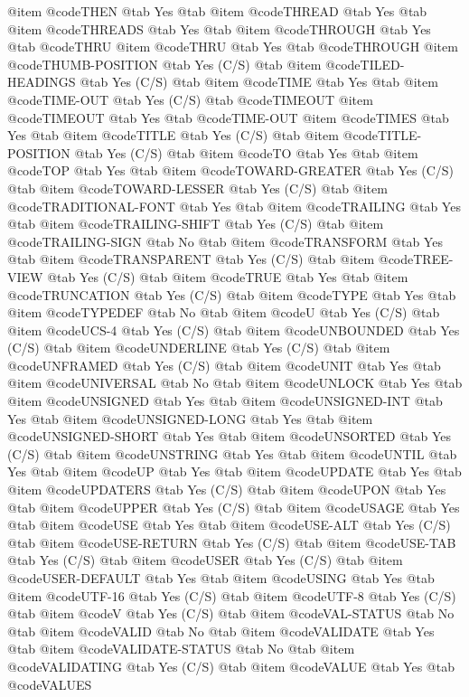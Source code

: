 @item @code{THEN} @tab Yes @tab 
@item @code{THREAD} @tab Yes @tab 
@item @code{THREADS} @tab Yes @tab 
@item @code{THROUGH} @tab Yes @tab @code{THRU}
@item @code{THRU} @tab Yes @tab @code{THROUGH}
@item @code{THUMB-POSITION} @tab Yes	(C/S) @tab 
@item @code{TILED-HEADINGS} @tab Yes	(C/S) @tab 
@item @code{TIME} @tab Yes @tab 
@item @code{TIME-OUT} @tab Yes	(C/S) @tab @code{TIMEOUT}
@item @code{TIMEOUT} @tab Yes @tab @code{TIME-OUT}
@item @code{TIMES} @tab Yes @tab 
@item @code{TITLE} @tab Yes	(C/S) @tab 
@item @code{TITLE-POSITION} @tab Yes	(C/S) @tab 
@item @code{TO} @tab Yes @tab 
@item @code{TOP} @tab Yes @tab 
@item @code{TOWARD-GREATER} @tab Yes	(C/S) @tab 
@item @code{TOWARD-LESSER} @tab Yes	(C/S) @tab 
@item @code{TRADITIONAL-FONT} @tab Yes @tab 
@item @code{TRAILING} @tab Yes @tab 
@item @code{TRAILING-SHIFT} @tab Yes	(C/S) @tab 
@item @code{TRAILING-SIGN} @tab No @tab 
@item @code{TRANSFORM} @tab Yes @tab 
@item @code{TRANSPARENT} @tab Yes	(C/S) @tab 
@item @code{TREE-VIEW} @tab Yes	(C/S) @tab 
@item @code{TRUE} @tab Yes @tab 
@item @code{TRUNCATION} @tab Yes	(C/S) @tab 
@item @code{TYPE} @tab Yes @tab 
@item @code{TYPEDEF} @tab No @tab 
@item @code{U} @tab Yes	(C/S) @tab 
@item @code{UCS-4} @tab Yes	(C/S) @tab 
@item @code{UNBOUNDED} @tab Yes	(C/S) @tab 
@item @code{UNDERLINE} @tab Yes	(C/S) @tab 
@item @code{UNFRAMED} @tab Yes	(C/S) @tab 
@item @code{UNIT} @tab Yes @tab 
@item @code{UNIVERSAL} @tab No @tab 
@item @code{UNLOCK} @tab Yes @tab 
@item @code{UNSIGNED} @tab Yes @tab 
@item @code{UNSIGNED-INT} @tab Yes @tab 
@item @code{UNSIGNED-LONG} @tab Yes @tab 
@item @code{UNSIGNED-SHORT} @tab Yes @tab 
@item @code{UNSORTED} @tab Yes	(C/S) @tab 
@item @code{UNSTRING} @tab Yes @tab 
@item @code{UNTIL} @tab Yes @tab 
@item @code{UP} @tab Yes @tab 
@item @code{UPDATE} @tab Yes @tab 
@item @code{UPDATERS} @tab Yes	(C/S) @tab 
@item @code{UPON} @tab Yes @tab 
@item @code{UPPER} @tab Yes	(C/S) @tab 
@item @code{USAGE} @tab Yes @tab 
@item @code{USE} @tab Yes @tab 
@item @code{USE-ALT} @tab Yes	(C/S) @tab 
@item @code{USE-RETURN} @tab Yes	(C/S) @tab 
@item @code{USE-TAB} @tab Yes	(C/S) @tab 
@item @code{USER} @tab Yes	(C/S) @tab 
@item @code{USER-DEFAULT} @tab Yes @tab 
@item @code{USING} @tab Yes @tab 
@item @code{UTF-16} @tab Yes	(C/S) @tab 
@item @code{UTF-8} @tab Yes	(C/S) @tab 
@item @code{V} @tab Yes	(C/S) @tab 
@item @code{VAL-STATUS} @tab No @tab 
@item @code{VALID} @tab No @tab 
@item @code{VALIDATE} @tab Yes @tab 
@item @code{VALIDATE-STATUS} @tab No @tab 
@item @code{VALIDATING} @tab Yes	(C/S) @tab 
@item @code{VALUE} @tab Yes @tab @code{VALUES}

